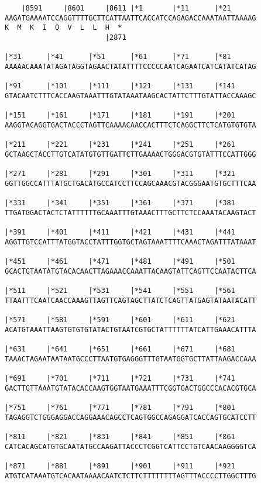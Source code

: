\documentclass{article}
\begin{document}
\begin{Verbatim}
    |8591     |8601     |8611 |*1       |*11      |*21      
AAGATGAAAATCCAGGTTTTGCTTCATTAATTCACCATCCAGAGACCAAATAATTAAAAG
K  M  K  I  Q  V  L  L  H  *   
                        |2871                               
  
|*31      |*41      |*51      |*61      |*71      |*81      
AAAAACAAATATAGATAGGTAGAACTATATTTTCCCCCAATCAGAATCATCATATCATAG
  
|*91      |*101     |*111     |*121     |*131     |*141     
GTACAATCTTTCACCAAGTAAATTTGTATAAATAAGCACTATTCTTTGTATTACCAAAGC
  
|*151     |*161     |*171     |*181     |*191     |*201     
AAGGTACAGGTGACTACCCTAGTTCAAAACAACCACTTTCTCAGGCTTCTCATGTGTGTA
  
|*211     |*221     |*231     |*241     |*251     |*261     
GCTAAGCTACCTTGTCATATGTGTTGATTCTTGAAAACTGGGACGTGTATTTCCATTGGG
  
|*271     |*281     |*291     |*301     |*311     |*321     
GGTTGGCCATTTATGCTGACATGCCATCCTTCCAGCAAACGTACGGGAATGTGCTTTCAA
  
|*331     |*341     |*351     |*361     |*371     |*381     
TTGATGGACTACTCTATTTTTTGCAAATTTGTAAACTTTGCTTCTCCAAATACAAGTACT
  
|*391     |*401     |*411     |*421     |*431     |*441     
AGGTTGTCCATTTATGGTACCTATTTGGTGCTAGTAAATTTTCAAACTAGATTTATAAAT
  
|*451     |*461     |*471     |*481     |*491     |*501     
GCACTGTAATATGTACACAACTTAGAAACCAAATTACAAGTATTCAGTTCCAATACTTCA
  
|*511     |*521     |*531     |*541     |*551     |*561     
TTAATTTCAATCAACCAAAGTTAGTTCAGTAGCTTATCTCAGTTATGAGTATAATACATT
  
|*571     |*581     |*591     |*601     |*611     |*621     
ACATGTAAATTAAGTGTGTGTATACTGTAATCGTGCTATTTTTTATCATTGAAACATTTA
  
|*631     |*641     |*651     |*661     |*671     |*681     
TAAACTAGAATAATAATGCCCTTAATGTGAGGGTTTGTAATGGTGCTTATTAAGACCAAA
  
|*691     |*701     |*711     |*721     |*731     |*741     
GACTTGTTAAATGTATACACCAAGTGGTAATGAAATTTCGGTGACTGGCCCACACGTGCA
  
|*751     |*761     |*771     |*781     |*791     |*801     
TAGAGGTCTGGGAGGACCAGGAAACAGCCTCAGTGGCCAGAGGATCACCAGTGCATCCTT
  
|*811     |*821     |*831     |*841     |*851     |*861     
CATCACAGCATGTGCAATATGCCAAGATTACCCTCGGTCATTCCTGTCAACAAGGGGTCA
  
|*871     |*881     |*891     |*901     |*911     |*921     
ATGTCATAAATGTCACAATAAAACAATCTCTTCTTTTTTTTAGTTTACCCCTTGGCTTTG
  

\end{Verbatim}
\end{document}
